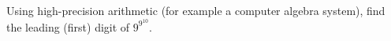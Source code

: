 Using high-precision arithmetic (for example a computer algebra system), find the leading (first) digit of $9^{9^{10}}$.
